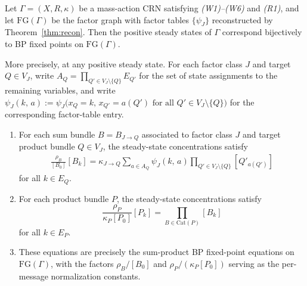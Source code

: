 \documentclass[10pt,a4paper]{amsart}
\newcommand{\Cat}{\textrm{Cat}}
\begin{document}
\begin{theorem}[BP Implementation]\label{thm:BP-implementation}
Let $\Gamma = (X, R, \kappa)$ be a mass-action CRN satisfying \emph{(W1)--(W6)} and \emph{(R1)}, 
and let $\mathrm{FG}(\Gamma)$ be the factor graph with factor tables $\{\psi_J\}$ reconstructed 
by Theorem~\ref{thm:recon}. Then the positive steady states of $\Gamma$ correspond 
bijectively to BP fixed points on $\mathrm{FG}(\Gamma)$.

More precisely, at any positive steady state. For each factor class $J$ and 
target $Q \in V_J$, write $A_Q = \prod_{Q' \in V_J \setminus \{Q\}} E_{Q'}$ 
for the set of state assignments to the remaining variables, and write 
$\psi_J(k,\, a) := \psi_J\bigl(x_Q = k,\, x_{Q'} = a(Q') \text{ for all } 
Q' \in V_J \setminus \{Q\}\bigr)$ for the corresponding factor-table entry.

\begin{enumerate}
\item For each sum bundle $B = B_{J \to Q}$ associated to factor class $J$ and 
target product bundle $Q \in V_J$, the steady-state concentrations satisfy
\begin{align}\label{eq:sum-steady}
\frac{\rho_B}{[B_0]}[B_k] 
= \kappa_{J \to Q} 
\sum_{a \in A_Q} 
\psi_J(k,\, a)
\prod_{Q' \in V_J\setminus\{Q\}} [Q'_{a(Q')}]
\end{align}
for all $k \in E_Q$.

\item For each product bundle $P$, the steady-state concentrations satisfy
\begin{equation}\label{eq:prod-steady}
\frac{\rho_P}{\kappa_P [P_0]}[P_k] = \prod_{B \in \Cat(P)} [B_k]
\end{equation}
for all $k \in E_P$.

\item These equations are precisely the sum-product BP fixed-point equations on 
$\mathrm{FG}(\Gamma)$, with the factors $\rho_B/[B_0]$ and $\rho_P/(\kappa_P[P_0])$ 
serving as the per-message normalization constants.
\end{enumerate}
\end{theorem}
\end{document}
